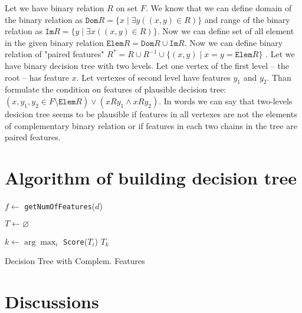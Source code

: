 \documentclass[conference]{IEEEtran}
\DeclarePairedDelimiter\abs{\lvert}{\rvert}
\let\emptyset\varnothing
\begin{document}
Let we have binary relation $R$ on set $F$. We know that we can define domain of the binary relation as $\texttt{Dom} R = \{x \mid \exists y ((x, y) \in R)\}$ and range of the binary relation as $\texttt{Im} R = \{y \mid \exists x ((x, y) \in R)\}$. Now we can define set of all element in the given binary relation $\texttt{Elem} R = \texttt{Dom} R \cup \texttt{Im} R$. Now we can define binary relation of "paired features" $R^* = R \cup R^{-1} \cup \{(x, y) \mid x = y= \texttt{Elem} R\}$ .
Let we have binary decision tree with two levels. Let one vertex of the first level -- the root -- has feature $x$. Let vertexes of second level have features $y_1$ and $y_2$. Than formulate the condition on features of plausible decision tree: $(x, y_1, y_2 \in F  \setminus \texttt{Elem} R) \lor (xRy_1 \land xRy_2)$. In words we can say that two-levels desicion tree seems to be plausible if features in all vertexes are not the elements of complementary binary relation or if features in each two chains in the tree are paired features.    

\section{Algorithm of building decision tree}

\begin{algorithm}
\SetAlgoLined
{}
 $f \gets$ \texttt{getNumOfFeatures}($d$)\;
 
 
 $T \gets \emptyset$\;
 
 $k \gets \arg\max_i$ \texttt{Score}($T_i$)\;
 \Return $T_k$
 
 \caption{Decision Tree with Complem. Features}
\end{algorithm}

\section{Discussions}
\end{document}
